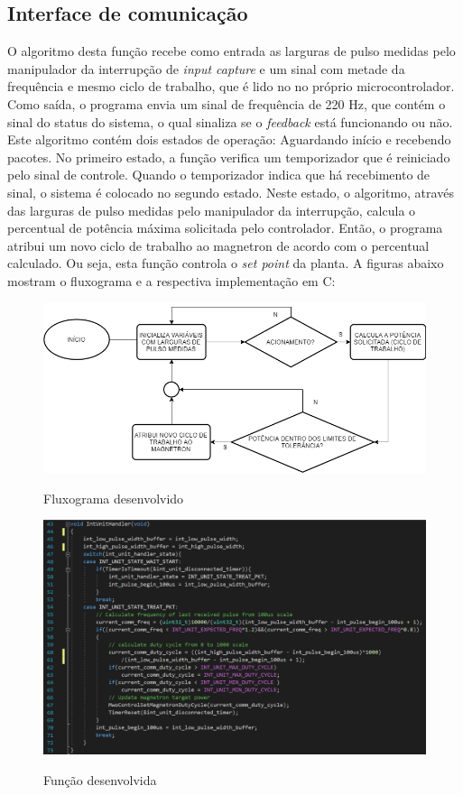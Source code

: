 \subsection{Interface de comunicação}
O algoritmo desta função recebe como entrada as larguras de pulso medidas pelo manipulador da interrupção de \textit{input capture} e um sinal com metade da frequência e mesmo ciclo de trabalho, que é lido no no próprio microcontrolador. Como saída, o programa envia um sinal de frequência de 220 Hz, que contém o sinal do status do sistema, o qual sinaliza se o \textit{feedback} está funcionando ou não. Este algoritmo contém dois estados de operação: Aguardando início e recebendo pacotes. No primeiro estado, a função verifica um temporizador que é reiniciado pelo sinal de controle. Quando o temporizador indica que há recebimento de sinal, o sistema é colocado no segundo estado. Neste estado, o algoritmo, através das larguras de pulso medidas pelo manipulador da interrupção, calcula o percentual de potência máxima solicitada pelo controlador. Então, o programa atribui um novo ciclo de trabalho ao magnetron de acordo com o percentual calculado. Ou seja, esta função controla o \textit{set point} da planta. A figuras abaixo mostram o fluxograma e a respectiva implementação em C:
\begin{figure}[H]
    \centering
    \caption{Fluxograma desenvolvido}
    \includegraphics[width=1\textwidth]{./dados/figuras/flow_comm}
    \label{fig:figura-func_comm}
\end{figure}


\begin{figure}[H]
    \centering
    \caption{Função desenvolvida}
    \includegraphics[width=1\textwidth]{./dados/figuras/func_comm}
    \label{fig:figura-func_comm}
\end{figure}